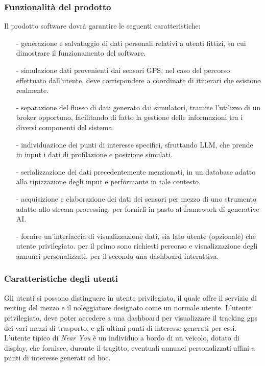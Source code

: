 \documentclass[11pt]{article}
\begin{document}
\begin{justify}
\subsubsection{Funzionalità del prodotto}
Il prodotto software dovrà garantire le seguenti caratteristiche:
\begin{itemize}
    \item [-] generazione e salvataggio di dati personali relativi a utenti fittizi, su cui dimostrare il funzionamento del software.
    \item [-] simulazione dati provenienti dai sensori GPS, nel caso del percorso effettuato dall'utente, deve corrispondere a coordinate di itinerari che esistono realmente.
    \item [-] separazione del flusso di dati generato dai simulatori, tramite l'utilizzo di un broker opportuno, facilitando di fatto la gestione delle informazioni tra i diversi componenti del sistema.
    \item [-] individuazione dei punti di interesse specifici, sfruttando LLM, che prende in input i dati di profilazione e posizione simulati.
    \item [-] serializzazione dei dati precedentemente menzionati, in un database adatto alla tipizzazione degli input e performante in tale contesto.
    \item [-] acquisizione e elaborazione dei dati dei sensori per mezzo di uno strumento adatto allo stream processing, per fornirli in pasto al framework di generative AI.
    \item [-] fornire un'interfaccia di visualizzazione dati, sia lato utente (opzionale) che utente privilegiato. per il primo sono richiesti percorso e visualizzazione degli annunci personalizzati, per il secondo una dashboard interattiva.
\end{itemize}

\subsubsection{Caratteristiche degli utenti}
Gli utenti si possono distinguere in utente privilegiato, il quale offre il servizio di renting del mezzo e il noleggiatore designato come un normale utente. L'utente privilegiato, deve poter accedere a una dashboard per visualizzare il tracking gps dei vari mezzi di trasporto, e gli ultimi punti di interesse generati per essi. L'utente tipico di \textit{Near You} è un individuo a bordo di un veicolo, dotato di display, che fornisce, durante il tragitto, eventuali annunci personalizzati affini a punti di interesse generati ad hoc.


\end{justify}
\end{document}
